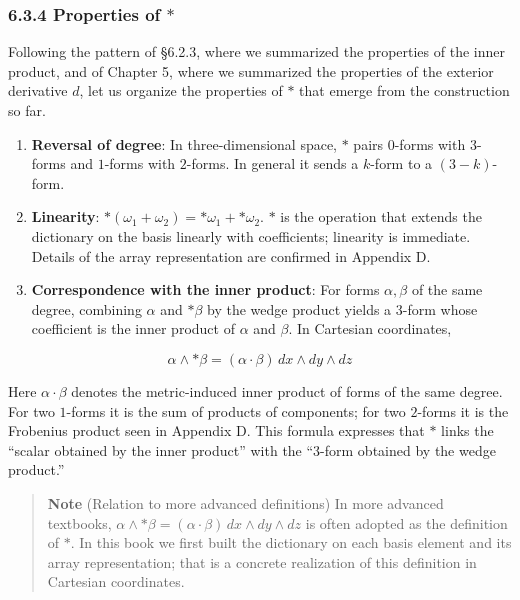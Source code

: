 \documentclass[a4paper,12pt,openany]{book}
\begin{document}
\hypertarget{properties-of-ast}{%
\subsubsection{\texorpdfstring{6.3.4 Properties of
\(\ast\)}{6.3.4 Properties of \textbackslash ast}}\label{properties-of-ast}}

Following the pattern of §6.2.3, where we summarized the properties of
the inner product, and of Chapter 5, where we summarized the properties
of the exterior derivative \(d\), let us organize the properties of
\(\ast\) that emerge from the construction so far.

\begin{enumerate}
\def\labelenumi{\arabic{enumi}.}
\item
  \textbf{Reversal of degree}: In three-dimensional space, \(\ast\)
  pairs \(0\)-forms with \(3\)-forms and \(1\)-forms with \(2\)-forms.
  In general it sends a \(k\)-form to a \((3-k)\)-form.
\item
  \textbf{Linearity}:
  \(\ast(\omega_1 + \omega_2) = \ast\omega_1 + \ast\omega_2\). \(\ast\)
  is the operation that extends the dictionary on the basis linearly
  with coefficients; linearity is immediate. Details of the array
  representation are confirmed in Appendix D.
\item
  \textbf{Correspondence with the inner product}: For forms
  \(\alpha, \beta\) of the same degree, combining \(\alpha\) and
  \(\ast\beta\) by the wedge product yields a \(3\)-form whose
  coefficient is the inner product of \(\alpha\) and \(\beta\). In
  Cartesian coordinates,
\end{enumerate}

\[
\alpha \wedge \ast\beta
=
(\alpha\cdot\beta)\,dx\wedge dy\wedge dz
\]

Here \(\alpha\cdot\beta\) denotes the metric-induced inner product of
forms of the same degree. For two \(1\)-forms it is the sum of products
of components; for two \(2\)-forms it is the Frobenius product seen in
Appendix D. This formula expresses that \(\ast\) links the ``scalar
obtained by the inner product'' with the ``\(3\)-form obtained by the
wedge product.''

\begin{quote}
\textbf{Note} (Relation to more advanced definitions) In more advanced
textbooks,
\(\alpha\wedge\ast\beta=(\alpha\cdot\beta)\,dx\wedge dy\wedge dz\) is
often adopted as the definition of \(\ast\). In this book we first built
the dictionary on each basis element and its array representation; that
is a concrete realization of this definition in Cartesian coordinates.
\end{quote}
\end{document}
